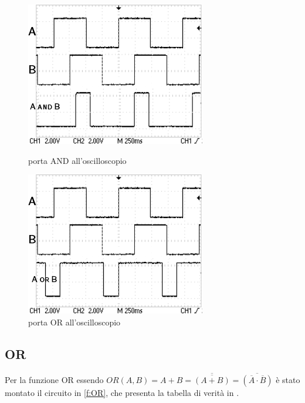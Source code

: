 \begin{figure}[H]
	\begin{minipage}{0.5\textwidth}
		\centering
		\includegraphics[scale=1]{../Figs-Tabs/and.png}
		\caption{porta AND all'oscilloscopio}
		\label{f:osci-and}
	\end{minipage}
	\begin{minipage}{0.5\textwidth}
		\centering
		\includegraphics[scale=1]{../Figs-Tabs/or.png}
		\caption{porta OR all'oscilloscopio}
		\label{f:osci-or}
	\end{minipage}
\end{figure}

\subsection{OR}
	Per la funzione OR essendo $ OR(A,B) = A + B = \overline{\overline{(A +B)}}= \overline{(\overline{A} \cdot \overline{B})}$	è stato montato il circuito in \figurename{ \ref{f:OR}}, che presenta la tabella di verità in .


